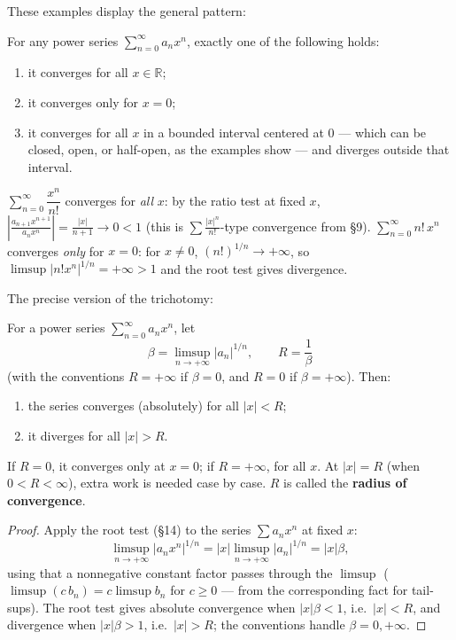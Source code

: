 \documentclass[11pt]{report}
\begin{document}
These examples display the general pattern:

\begin{thmbox}
For any power series $\sum_{n=0}^\infty a_n x^n$, exactly one of the following holds:
\begin{enumerate}[label=(\arabic*)]
    \item it converges for all $x \in \mathbb{R}$;
    \item it converges only for $x = 0$;
    \item it converges for all $x$ in a bounded interval centered at $0$ --- which can be closed, open, or half-open, as the examples show --- and diverges outside that interval.
\end{enumerate}
\end{thmbox}

\begin{exbox}
$\sum_{n=0}^\infty \dfrac{x^n}{n!}$ converges for \emph{all} $x$: by the ratio test at fixed $x$, $\left|\tfrac{a_{n+1}x^{n+1}}{a_n x^n}\right| = \tfrac{|x|}{n+1} \to 0 < 1$ (this is $\sum \tfrac{|x|^n}{n!}$-type convergence from \S 9). $\sum_{n=0}^\infty n!\, x^n$ converges \emph{only} for $x = 0$: for $x \neq 0$, $(n!)^{1/n} \to +\infty$, so $\limsup |n! x^n|^{1/n} = +\infty > 1$ and the root test gives divergence.
\end{exbox}

The precise version of the trichotomy:

\begin{thmbox}
For a power series $\sum_{n=0}^\infty a_n x^n$, let
\[
\beta = \limsup_{n\to+\infty} |a_n|^{1/n}, \qquad R = \frac{1}{\beta}
\]
(with the conventions $R = +\infty$ if $\beta = 0$, and $R = 0$ if $\beta = +\infty$). Then:
\begin{enumerate}[label=(\arabic*)]
    \item the series converges (absolutely) for all $|x| < R$;
    \item it diverges for all $|x| > R$.
\end{enumerate}
If $R = 0$, it converges only at $x = 0$; if $R = +\infty$, for all $x$. At $|x| = R$ (when $0 < R < \infty$), extra work is needed case by case. $R$ is called the \textbf{radius of convergence}.
\end{thmbox}

\begin{proof}
Apply the root test (\S 14) to the series $\sum a_n x^n$ at fixed $x$:
\[
\limsup_{n\to+\infty} |a_n x^n|^{1/n} = |x| \limsup_{n\to+\infty} |a_n|^{1/n} = |x| \beta,
\]
using that a nonnegative constant factor passes through the $\limsup$ ($\limsup (c\, b_n) = c \limsup b_n$ for $c \geq 0$ --- from the corresponding fact for tail-sups). The root test gives absolute convergence when $|x|\beta < 1$, i.e.\ $|x| < R$, and divergence when $|x|\beta > 1$, i.e.\ $|x| > R$; the conventions handle $\beta = 0, +\infty$.
\end{proof}
\end{document}
